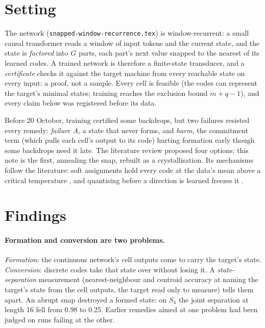 \documentclass[11pt]{article}
\begin{document}
\section{Setting}

The network (\texttt{snapped-window-recurrence.tex}) is window-recurrent: a small causal transformer
reads a window of input tokens and the current state, and the state is \emph{factored} into $G$
parts, each part's next value snapped to the nearest of its learned codes. A trained network is
therefore a finite-state transducer, and a \emph{certificate} checks it against the target machine
from every reachable state on every input: a proof, not a sample. Every cell is feasible (the codes
can represent the target's minimal states; training reaches the exclusion bound $m + q - 1$), and
every claim below was registered before its data.

Before 20 October, training certified some backdrops, but two failures resisted every remedy:
\emph{failure A}, a state that never forms, and \emph{harm}, the commitment term (which pulls each
cell's output to its code) hurting formation early though some backdrops need it late. The literature
review proposed four options; this note is the first, annealing the snap, rebuilt as a
crystallisation. Its mechanisms follow the literature: soft assignments hold every code at the data's
mean above a critical temperature \citep{rose-1998-deterministic-annealing-clustering}, and quantising
before a direction is learned freezes it \citep{zhao-2026-continuous-first-discrete-later-vq-vae}.

\section{Findings}

\paragraph{Formation and conversion are two problems.} \emph{Formation}: the continuous network's
cell outputs come to carry the target's state. \emph{Conversion}: discrete codes take that state over
without losing it. A \emph{state-separation} measurement (nearest-neighbour and centroid accuracy at
naming the target's state from the cell outputs, the target read only to measure) tells them apart.
An abrupt snap destroyed a formed state: on $S_4$ the joint separation at length 16 fell from 0.98 to
0.25. Earlier remedies aimed at one problem had been judged on runs failing at the other.
\end{document}

